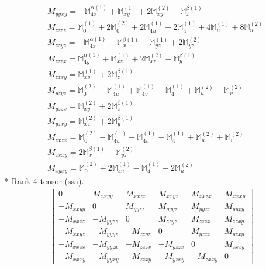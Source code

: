 \documentclass[fleqn,8pt,landscape]{jsarticle}
\begin{document}
\begin{align*}
& M_{yyxy} = - \mathbb{M}_{4z}^{\alpha(1)} + \mathbb{M}_{xy}^{(1)} + 2 \mathbb{M}_{xy}^{(2)} - \mathbb{M}_{z}^{\beta(1)} \\
& M_{zzzz} = \mathbb{M}_{0}^{(1)} + 2 \mathbb{M}_{0}^{(2)} + 2 \mathbb{M}_{4u}^{(1)} + 2 \mathbb{M}_{4}^{(1)} + 4 \mathbb{M}_{u}^{(1)} + 8 \mathbb{M}_{u}^{(2)} \\
& M_{zzyz} = - \mathbb{M}_{4x}^{\alpha(1)} - \mathbb{M}_{x}^{\beta(1)} + \mathbb{M}_{yz}^{(1)} + 2 \mathbb{M}_{yz}^{(2)} \\
& M_{zzzx} = \mathbb{M}_{4y}^{\alpha(1)} + \mathbb{M}_{xz}^{(1)} + 2 \mathbb{M}_{xz}^{(2)} - \mathbb{M}_{y}^{\beta(1)} \\
& M_{zzxy} = \mathbb{M}_{xy}^{(1)} + 2 \mathbb{M}_{z}^{\beta(1)} \\
& M_{yzyz} = \mathbb{M}_{0}^{(2)} - \mathbb{M}_{4u}^{(1)} + \mathbb{M}_{4v}^{(1)} - \mathbb{M}_{4}^{(1)} + \mathbb{M}_{u}^{(2)} - \mathbb{M}_{v}^{(2)} \\
& M_{yzzx} = \mathbb{M}_{xy}^{(2)} + 2 \mathbb{M}_{z}^{\beta(1)} \\
& M_{yzxy} = \mathbb{M}_{xz}^{(2)} + 2 \mathbb{M}_{y}^{\beta(1)} \\
& M_{zxzx} = \mathbb{M}_{0}^{(2)} - \mathbb{M}_{4u}^{(1)} - \mathbb{M}_{4v}^{(1)} - \mathbb{M}_{4}^{(1)} + \mathbb{M}_{u}^{(2)} + \mathbb{M}_{v}^{(2)} \\
& M_{zxxy} = 2 \mathbb{M}_{x}^{\beta(1)} + \mathbb{M}_{yz}^{(2)} \\
& M_{xyxy} = \mathbb{M}_{0}^{(2)} + 2 \mathbb{M}_{4u}^{(1)} - \mathbb{M}_{4}^{(1)} - 2 \mathbb{M}_{u}^{(2)}
\end{align*}
* Rank 4 tensor (ssa).
\begin{align*}
\begin{bmatrix} 0 & M_{xxyy} & M_{xxzz} & M_{xxyz} & M_{xxzx} & M_{xxxy} \\ - M_{xxyy} & 0 & M_{yyzz} & M_{yyyz} & M_{yyzx} & M_{yyxy} \\ - M_{xxzz} & - M_{yyzz} & 0 & M_{zzyz} & M_{zzzx} & M_{zzxy} \\ - M_{xxyz} & - M_{yyyz} & - M_{zzyz} & 0 & M_{yzzx} & M_{yzxy} \\ - M_{xxzx} & - M_{yyzx} & - M_{zzzx} & - M_{yzzx} & 0 & M_{zxxy} \\ - M_{xxxy} & - M_{yyxy} & - M_{zzxy} & - M_{yzxy} & - M_{zxxy} & 0 \end{bmatrix}
\end{align*}
\end{document}
